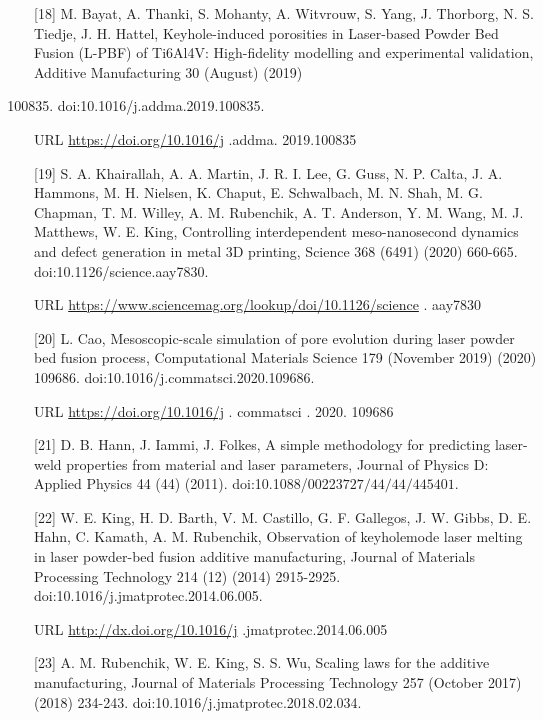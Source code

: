 \documentclass[10pt]{article}
\begin{document}
[18] M. Bayat, A. Thanki, S. Mohanty, A. Witvrouw, S. Yang, J. Thorborg, N. S. Tiedje, J. H. Hattel, Keyhole-induced porosities in Laser-based Powder Bed Fusion (L-PBF) of Ti6Al4V: High-fidelity modelling and experimental validation, Additive Manufacturing 30 (August) (2019)

\begin{enumerate}
  \setcounter{enumi}{100834}
  \item doi:10.1016/j.addma.2019.100835.
\end{enumerate}

URL \href{https://doi.org/10.1016/j}{https://doi.org/10.1016/j} .addma. 2019.100835

[19] S. A. Khairallah, A. A. Martin, J. R. I. Lee, G. Guss, N. P. Calta, J. A. Hammons, M. H. Nielsen, K. Chaput, E. Schwalbach, M. N. Shah, M. G. Chapman, T. M. Willey, A. M. Rubenchik, A. T. Anderson, Y. M. Wang, M. J. Matthews, W. E. King, Controlling interdependent meso-nanosecond dynamics and defect generation in metal 3D printing, Science 368 (6491) (2020) 660-665. doi:10.1126/science.aay7830.

URL \href{https://www.sciencemag.org/lookup/doi/10.1126/science}{https://www.sciencemag.org/lookup/doi/10.1126/science} . aay7830

[20] L. Cao, Mesoscopic-scale simulation of pore evolution during laser powder bed fusion process, Computational Materials Science 179 (November 2019) (2020) 109686. doi:10.1016/j.commatsci.2020.109686.

URL \href{https://doi.org/10.1016/j}{https://doi.org/10.1016/j} . commatsci . 2020. 109686

[21] D. B. Hann, J. Iammi, J. Folkes, A simple methodology for predicting laser-weld properties from material and laser parameters, Journal of Physics D: Applied Physics 44 (44) (2011). doi:10.1088/0022$3727 / 44 / 44 / 445401$.

[22] W. E. King, H. D. Barth, V. M. Castillo, G. F. Gallegos, J. W. Gibbs, D. E. Hahn, C. Kamath, A. M. Rubenchik, Observation of keyholemode laser melting in laser powder-bed fusion additive manufacturing, Journal of Materials Processing Technology 214 (12) (2014) 2915-2925. doi:10.1016/j.jmatprotec.2014.06.005.

URL \href{http://dx.doi.org/10.1016/j}{http://dx.doi.org/10.1016/j} .jmatprotec.2014.06.005

[23] A. M. Rubenchik, W. E. King, S. S. Wu, Scaling laws for the additive manufacturing, Journal of Materials Processing Technology 257 (October 2017) (2018) 234-243. doi:10.1016/j.jmatprotec.2018.02.034.
\end{document}
